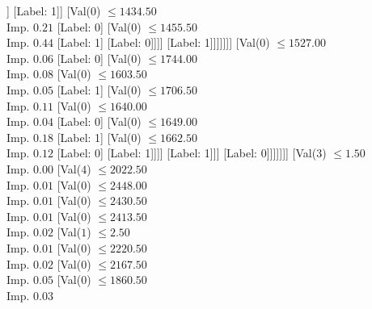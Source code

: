 \documentclass[margin=10pt]{standalone}
\begin{document}
\begin{forest}
											[Label: 0]
											[Val($0$) $ \leq 1350.50$ \\ Imp. $0.03$
												[Label: 1]
												[Val($0$) $ \leq 1374.00$ \\ Imp. $0.06$
													[Label: 0]
													[Val($0$) $ \leq 1457.50$ \\ Imp. $0.04$
														[Val($0$) $ \leq 1423.00$ \\ Imp. $0.08$
															[Val($0$) $ \leq 1385.50$ \\ Imp. $0.12$
																[Val($0$) $ \leq 1377.00$ \\ Imp. $0.50$
																	[Label: 1]
																	[Label: 0]]
																[Label: 1]]
															[Val($0$) $ \leq 1434.50$ \\ Imp. $0.21$
																[Label: 0]
																[Val($0$) $ \leq 1455.50$ \\ Imp. $0.44$
																	[Label: 1]
																	[Label: 0]]]]
														[Label: 1]]]]]]]
								[Val($0$) $ \leq 1527.00$ \\ Imp. $0.06$
									[Label: 0]
									[Val($0$) $ \leq 1744.00$ \\ Imp. $0.08$
										[Val($0$) $ \leq 1603.50$ \\ Imp. $0.05$
											[Label: 1]
											[Val($0$) $ \leq 1706.50$ \\ Imp. $0.11$
												[Val($0$) $ \leq 1640.00$ \\ Imp. $0.04$
													[Label: 0]
													[Val($0$) $ \leq 1649.00$ \\ Imp. $0.18$
														[Label: 1]
														[Val($0$) $ \leq 1662.50$ \\ Imp. $0.12$
															[Label: 0]
															[Label: 1]]]]
												[Label: 1]]]
										[Label: 0]]]]]]]
				[Val($3$) $ \leq 1.50$ \\ Imp. $0.00$
					[Val($4$) $ \leq 2022.50$ \\ Imp. $0.01$
						[Val($0$) $ \leq 2448.00$ \\ Imp. $0.01$
							[Val($0$) $ \leq 2430.50$ \\ Imp. $0.01$
								[Val($0$) $ \leq 2413.50$ \\ Imp. $0.02$
									[Val($1$) $ \leq 2.50$ \\ Imp. $0.01$
										[Val($0$) $ \leq 2220.50$ \\ Imp. $0.02$
											[Val($0$) $ \leq 2167.50$ \\ Imp. $0.05$
												[Val($0$) $ \leq 1860.50$ \\ Imp. $0.03$

\end{forest}
\end{document}
